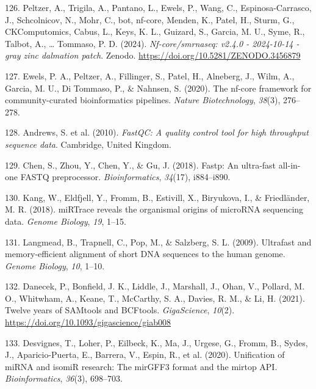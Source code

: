 \documentclass[
  11pt,
  letterpaper,
]{book}
\newlength{\cslhangindent}
\newenvironment{CSLReferences}[2] %
 {\begin{list}{}{%
  \setlength{\itemindent}{0pt}
  \setlength{\leftmargin}{0pt}
  \setlength{\parsep}{0pt}
  \ifodd #1
   \setlength{\leftmargin}{\cslhangindent}
   \setlength{\itemindent}{-1\cslhangindent}
  \fi
  \setlength{\itemsep}{#2\baselineskip}}}
 {\end{list}}
\begin{document}
\begin{CSLReferences}{1}{0}
126. Peltzer, A., Trigila, A., Pantano, L., Ewels, P., Wang, C.,
Espinosa-Carrasco, J., Schcolnicov, N., Mohr, C., bot, nf-core, Menden,
K., Patel, H., Sturm, G., CKComputomics, Cabus, L., Keys, K. L.,
Guizard, S., Garcia, M. U., Syme, R., Talbot, A., \ldots{} Tommaso, P.
D. (2024). \emph{Nf-core/smrnaseq: v2.4.0 - 2024-10-14 - gray zinc
dalmation patch}. Zenodo. \url{https://doi.org/10.5281/ZENODO.3456879}

127. Ewels, P. A., Peltzer, A., Fillinger, S., Patel, H., Alneberg, J.,
Wilm, A., Garcia, M. U., Di Tommaso, P., \& Nahnsen, S. (2020). The
nf-core framework for community-curated bioinformatics pipelines.
\emph{Nature Biotechnology}, \emph{38}(3), 276--278.

128. Andrews, S. et al. (2010). \emph{FastQC: A quality control tool for
high throughput sequence data}. Cambridge, United Kingdom.

129. Chen, S., Zhou, Y., Chen, Y., \& Gu, J. (2018). Fastp: An
ultra-fast all-in-one FASTQ preprocessor. \emph{Bioinformatics},
\emph{34}(17), i884--i890.

130. Kang, W., Eldfjell, Y., Fromm, B., Estivill, X., Biryukova, I., \&
Friedländer, M. R. (2018). miRTrace reveals the organismal origins of
microRNA sequencing data. \emph{Genome Biology}, \emph{19}, 1--15.

131. Langmead, B., Trapnell, C., Pop, M., \& Salzberg, S. L. (2009).
Ultrafast and memory-efficient alignment of short DNA sequences to the
human genome. \emph{Genome Biology}, \emph{10}, 1--10.

132. Danecek, P., Bonfield, J. K., Liddle, J., Marshall, J., Ohan, V.,
Pollard, M. O., Whitwham, A., Keane, T., McCarthy, S. A., Davies, R. M.,
\& Li, H. (2021). {Twelve years of SAMtools and BCFtools}.
\emph{GigaScience}, \emph{10}(2).
\url{https://doi.org/10.1093/gigascience/giab008}

133. Desvignes, T., Loher, P., Eilbeck, K., Ma, J., Urgese, G., Fromm,
B., Sydes, J., Aparicio-Puerta, E., Barrera, V., Espin, R., et al.
(2020). Unification of miRNA and isomiR research: The mirGFF3 format and
the mirtop API. \emph{Bioinformatics}, \emph{36}(3), 698--703.


\end{CSLReferences}
\end{document}
